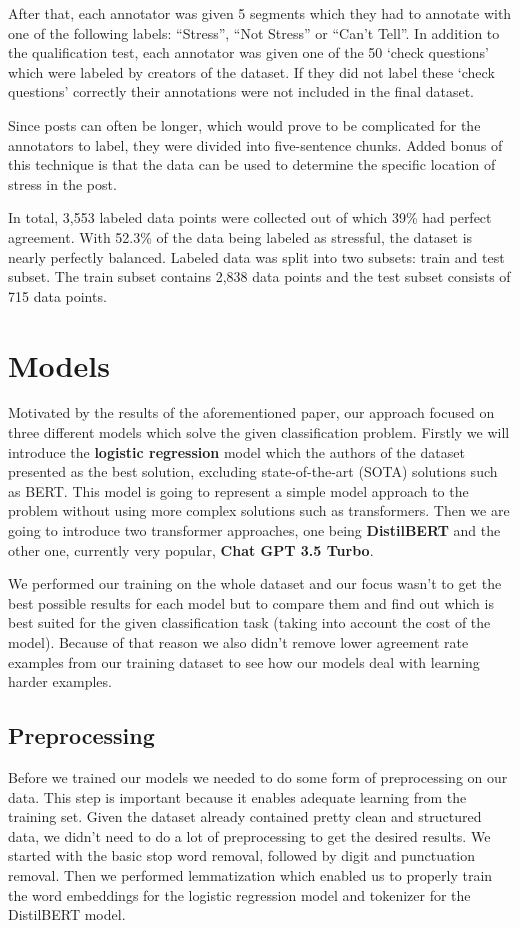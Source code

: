 \documentclass[10pt, a4paper]{article}
\begin{document}
After that, each annotator was given 5 segments which they had to annotate with one of the following labels: ``Stress'', ``Not Stress'' or ``Can't Tell''.
In addition to the qualification test, each annotator was given one of the 50 `check questions' which were labeled by creators of the dataset.
If they did not label these `check questions' correctly their annotations were not included in the final dataset.

Since posts can often be longer, which would prove to be complicated for the annotators to label, they were divided into five-sentence chunks.
Added bonus of this technique is that the data can be used to determine the specific location of stress in the post.

In total, 3,553 labeled data points were collected out of which 39\% had perfect agreement.
With 52.3\% of the data being labeled as stressful, the dataset is nearly perfectly balanced.
Labeled data was split into two subsets: train and test subset.
The train subset contains 2,838 data points and the test subset consists of 715 data points.

\section{Models}
Motivated by the results of the aforementioned paper, our approach focused on three different models which solve the given classification problem.
\hfill \break
\hfill \break
Firstly we will introduce the \textbf{logistic regression} model which the authors of the dataset presented as the best solution, excluding state-of-the-art (SOTA) solutions such as BERT.
This model is going to represent a simple model approach to the problem without using more complex solutions such as transformers.
Then we are going to introduce two transformer approaches, one being \textbf{DistilBERT} and the other one, currently very popular, \textbf{Chat GPT 3.5 Turbo}.

We performed our training on the whole dataset and our focus wasn't to get the best possible results for each model but to compare them and find out which is best suited for the given classification task (taking into account the cost of the model).
Because of that reason we also didn't remove lower agreement rate examples from our training dataset to see how our models deal with learning harder examples.

\subsection{Preprocessing}
Before we trained our models we needed to do some form of preprocessing on our data.
This step is important because it enables adequate learning from the training set.
Given the dataset already contained pretty clean and structured data, we didn't need to do a lot of preprocessing to get the desired results.
We started with the basic stop word removal, followed by digit and punctuation removal.
Then we performed lemmatization which enabled us to properly train the word embeddings for the logistic regression model and tokenizer for the DistilBERT model.
\end{document}
